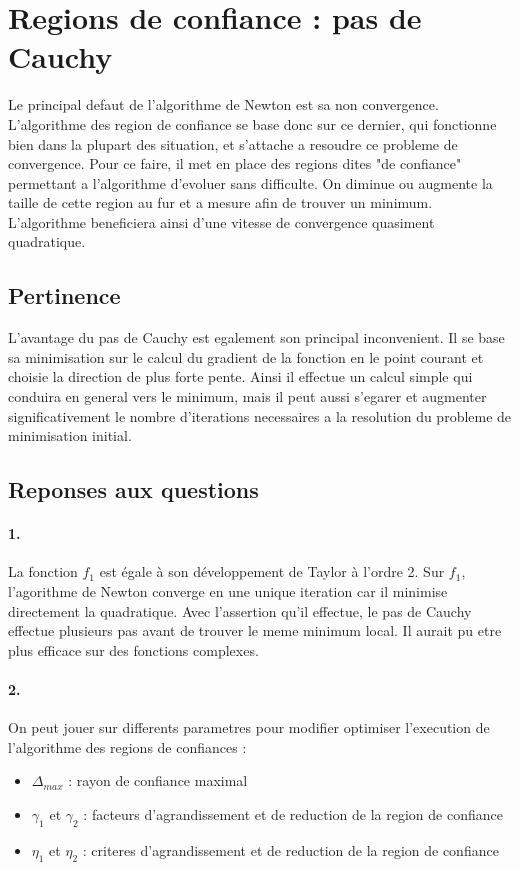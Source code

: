 \documentclass[12pt]{article}
\begin{document}
\section{Regions de confiance : pas de Cauchy}
Le principal defaut de l'algorithme de Newton est sa non convergence. L'algorithme des region de confiance se base donc sur ce dernier, qui fonctionne bien dans la plupart des situation, et s'attache a resoudre ce probleme de convergence. Pour ce faire, il met en place des regions dites "de confiance" permettant a l'algorithme d'evoluer sans difficulte. On diminue ou augmente la taille de cette region au fur et a mesure afin de trouver un minimum. L'algorithme beneficiera ainsi d'une vitesse de convergence quasiment quadratique.

\subsection{Pertinence}
L'avantage du pas de Cauchy est egalement son principal inconvenient. Il se base sa minimisation sur le calcul du gradient de la fonction en le point courant et choisie la direction de plus forte pente. Ainsi il effectue un calcul simple qui conduira en general vers le minimum, mais il peut aussi s'egarer et augmenter significativement le nombre d'iterations necessaires a la resolution du probleme de minimisation initial.

\subsection{Reponses aux questions}
\paragraph{1.}
La fonction $f_1$ est égale à son développement de Taylor à l'ordre 2.
Sur $f_1$, l'agorithme de Newton converge en une unique iteration car il minimise directement la quadratique. Avec l'assertion qu'il effectue, le pas de Cauchy effectue plusieurs pas avant de trouver le meme minimum local. Il aurait pu etre plus efficace sur des fonctions complexes.

\paragraph{2.}
On peut jouer sur differents parametres pour modifier optimiser l'execution de l'algorithme des regions de confiances :
\begin{itemize}
	\item $\Delta_{max}$ : rayon de confiance maximal
	\item $\gamma_1$ et $\gamma_2$ : facteurs d'agrandissement et de reduction de la region de confiance
	\item $\eta_1$ et $\eta_2$ : criteres d'agrandissement et de reduction de la region de confiance
\end{itemize}
\end{document}
